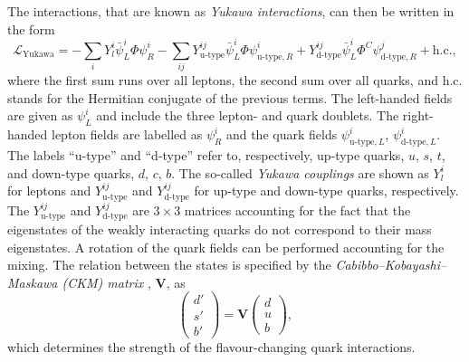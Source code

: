 The interactions, that are known as \emph{Yukawa interactions}, can then be written in the form
\begin{equation}
  \mathcal{L}_\text{Yukawa} = - \sum_{i} Y_l^i \bar{\psi}^{i}_{L} \Phi \psi^{i}_{R} - \sum_{ij} Y_{\text{u-type}}^{ij} \bar{\psi}^{i}_{L} \Phi \psi^{i}_{\text{u-type},R} + Y_{\text{d-type}}^{ij} \bar{\psi}^{i}_{L} \Phi^C \psi^{j}_{\text{d-type}, R} + \text{h.c.}, 
  \label{eq:lyukawa}
\end{equation}
where the first sum runs over all leptons, the second sum over all quarks, and h.c. stands for the Hermitian conjugate of the previous terms.
The left-handed fields are given as $\psi^{i}_{L}$ and include the three lepton- and quark doublets. 
The right-handed lepton fields are labelled as $\psi_R^i$ and the quark fields $\psi^{i}_{\text{u-type},L}$, $\psi^{i}_{\text{d-type},L}$.
The labels ``u-type'' and ``d-type'' refer to, respectively, up-type quarks, $u$, $s$, $t$, and down-type quarks, $d$, $c$, $b$. 
The so-called \emph{Yukawa couplings} are shown as $Y_l^i$ for leptons and $Y_{\text{u-type}}^{ij}$ and $Y_{\text{d-type}}^{ij}$ for up-type and down-type quarks, respectively. The $Y_{\text{u-type}}^{ij}$ and $Y_{\text{d-type}}^{ij}$ are $3 \times 3$ matrices accounting for the fact that the eigenstates of the weakly interacting quarks do not correspond to their mass eigenstates. A rotation of the quark fields can be performed accounting for the mixing. 
The relation between the states is specified by the \emph{Cabibbo–Kobayashi–Maskawa (CKM) matrix} \cite{doi:10.1143/PTP.49.652}, $\pmb{V}$, as
\begin{equation}
  \begin{pmatrix}
   d' \\
   s' \\
   b'
 \end{pmatrix}
 = 
 \pmb{V} 
 \begin{pmatrix}
   d \\
   u \\
   b
 \end{pmatrix}, 
\end{equation}
which determines the strength of the flavour-changing quark interactions.


